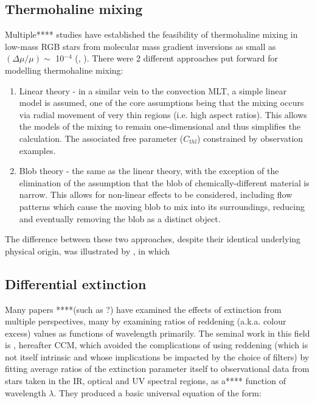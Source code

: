 \documentclass[usenatbib]{mnras}
\begin{document}
\subsection{Thermohaline mixing}
Multiple**** studies have established the feasibility of thermohaline mixing in low-mass RGB stars from molecular mass gradient inversions as small as $(\Delta\mu / \mu) \sim$ 10$^{-4}$ (\cite{2006Sci...314.1580E}, \cite{2010ApJ...723..563D}). There were 2 different approaches put forward for modelling thermohaline mixing:
\begin{enumerate}
\item Linear theory \citep{1972ApJ...172..165U} - in a similar vein to the convection MLT, a simple linear model is assumed, one of the core assumptions being that the mixing occurs via radial movement of very thin regions (i.e. high aspect ratios). This allows the models of the mixing to remain one-dimensional and thus simplifies the calculation. The associated free parameter ($C_{thl}$) constrained by observation examples.
\item Blob theory \citep{1980A&A....91..175K} - the same as the linear theory, with the exception of the elimination of the assumption that the blob of chemically-different material is narrow. This allows for non-linear effects to be considered, including flow patterns which cause the moving blob to mix into its surroundings, reducing and eventually removing the blob as a distinct object.
\end{enumerate}

The difference between these two approaches, despite their identical underlying physical origin, was illustrated by \citet{2010ApJ...723..563D}, in which 

\subsection{Differential extinction}
Many papers ****(such as ?) have examined the effects of extinction from multiple perspectives, many by examining ratios of reddening (a.k.a. colour excess) values as functions of wavelength primarily. The seminal work in this field is \cite{1989ApJ...345..245C}, hereafter CCM, which avoided the complications of using reddening (which is not itself intrinsic and whose implications be impacted by the choice of filters) by fitting average ratios of the extinction parameter itself to observational data from stars taken in the IR, optical and UV spectral regions, as a**** function of wavelength $\lambda$. They produced a basic universal equation of the form:
\end{document}
